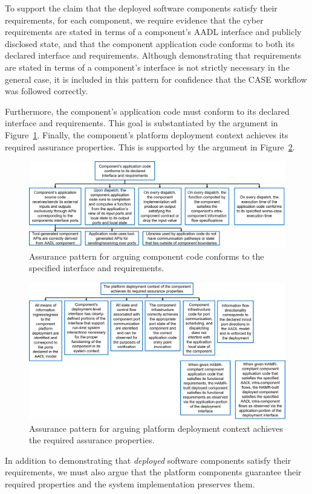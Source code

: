 To support the claim that the deployed software components satisfy their requirements,
for each component, we require evidence that the cyber requirements are stated in terms of a component's AADL interface and publicly disclosed state, and that the component application code conforms to both its declared interface and requirements.  Although demonstrating that requirements are stated in terms of a component's interface is not strictly necessary in the general case, it is included in this pattern for confidence that the CASE workflow was followed correctly. 


Furthermore, the component's application code must conform to its declared interface and requirements.  This goal is substantiated by the argument in Figure~\ref{fig:code-conforms-to-interface-and-requirements}.
%
%
Finally, the component's platform deployment context achieves its required assurance properties.  This is supported by the argument in Figure~\ref{fig:platform-deployment-context-achieves-assurance-properties}.


\begin{figure}[h]
	\centering 
	\includegraphics[width=\textwidth]{figs/code-conforms-to-interface-and-requirements.png}
	\caption{Assurance pattern for arguing component code conforms to the specified interface and requirements.}
	\label{fig:code-conforms-to-interface-and-requirements} 
\end{figure}


\begin{figure}[h] 
	\centering 
	\includegraphics[width=\textwidth]{figs/platform-deployment-context-achieves-assurance-properties.png}
	\caption{Assurance pattern for arguing platform deployment context achieves the required assurance properties.}
	\label{fig:platform-deployment-context-achieves-assurance-properties} 
\end{figure}



In addition to demonstrating that \textit{deployed} software components satisfy their requirements, we must also argue that the platform components guarantee their required properties and the system implementation preserves them.